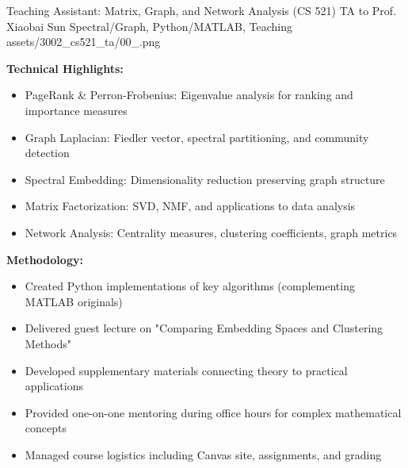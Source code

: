 \ProjectEntry
{Teaching Assistant: Matrix, Graph, and Network Analysis (CS 521)}
{TA to Prof. Xiaobai Sun}
{Spectral/Graph, Python/MATLAB, Teaching}
{
}
{assets/3002_cs521_ta/00_.png}
{ \quad {}}
{  }

\textbf{Technical Highlights:}
\begin{itemize}[leftmargin=1.2em, itemsep=0.1em]
  \item PageRank \& Perron-Frobenius: Eigenvalue analysis for ranking and importance measures
  \item Graph Laplacian: Fiedler vector, spectral partitioning, and community detection
  \item Spectral Embedding: Dimensionality reduction preserving graph structure
  \item Matrix Factorization: SVD, NMF, and applications to data analysis
  \item Network Analysis: Centrality measures, clustering coefficients, graph metrics
\end{itemize}

\textbf{Methodology:}
\begin{itemize}[leftmargin=1.2em, itemsep=0.1em]
  \item Created Python implementations of key algorithms (complementing MATLAB originals)
  \item Delivered guest lecture on "Comparing Embedding Spaces and Clustering Methods"
  \item Developed supplementary materials connecting theory to practical applications
  \item Provided one-on-one mentoring during office hours for complex mathematical concepts
  \item Managed course logistics including Canvas site, assignments, and grading
\end{itemize}


